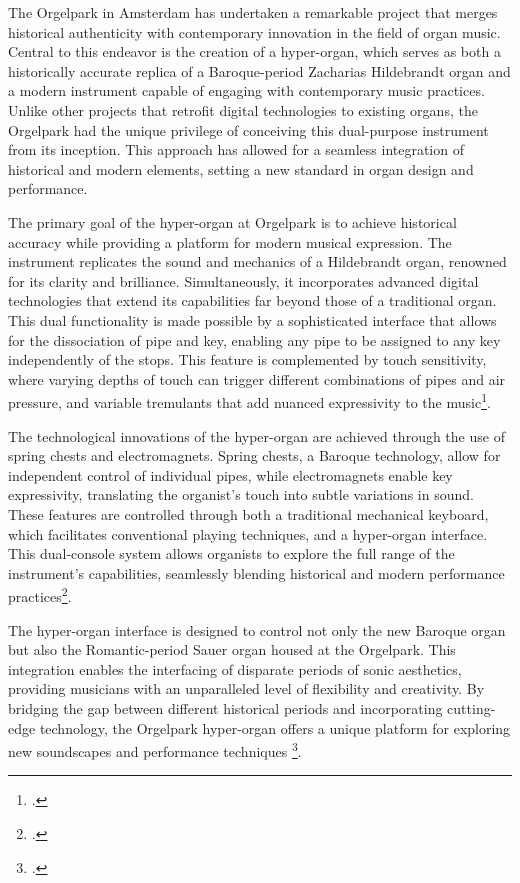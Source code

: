 \documentclass[12pt,twoside,maitrise]{dms_ks}
\theoremstyle{definition}
\begin{document}
{The Orgelpark in Amsterdam has undertaken a remarkable project that merges historical authenticity with contemporary innovation in the field of organ music. 
Central to this endeavor is the creation of a hyper-organ, which serves as both a historically accurate replica of a Baroque-period Zacharias Hildebrandt organ and a modern instrument capable of engaging with contemporary music practices. 
Unlike other projects that retrofit digital technologies to existing organs, the Orgelpark had the unique privilege of conceiving this dual-purpose instrument from its inception. 
This approach has allowed for a seamless integration of historical and modern elements, setting a new standard in organ design and performance.

The primary goal of the hyper-organ at Orgelpark is to achieve historical accuracy while providing a platform for modern musical expression. 
The instrument replicates the sound and mechanics of a Hildebrandt organ, renowned for its clarity and brilliance. 
Simultaneously, it incorporates advanced digital technologies that extend its capabilities far beyond those of a traditional organ. 
This dual functionality is made possible by a sophisticated interface that allows for the dissociation of pipe and key, enabling any pipe to be assigned to any key independently of the stops. 
This feature is complemented by touch sensitivity, where varying depths of touch can trigger different combinations of pipes and air pressure, and variable tremulants that add nuanced expressivity to the music\footcite{fidom_digital_2014}.

The technological innovations of the hyper-organ are achieved through the use of spring chests and electromagnets. 
Spring chests, a Baroque technology, allow for independent control of individual pipes, while electromagnets enable key expressivity, translating the organist's touch into subtle variations in sound. 
These features are controlled through both a traditional mechanical keyboard, which facilitates conventional playing techniques, and a hyper-organ interface. 
This dual-console system allows organists to explore the full range of the instrument's capabilities, seamlessly blending historical and modern performance practices\footcite{peters_how_2014}.

The hyper-organ interface is designed to control not only the new Baroque organ but also the Romantic-period Sauer organ housed at the Orgelpark. 
This integration enables the interfacing of disparate periods of sonic aesthetics, providing musicians with an unparalleled level of flexibility and creativity. By bridging the gap between different historical periods and incorporating cutting-edge technology, the Orgelpark hyper-organ offers a unique platform for exploring new soundscapes and performance techniques \footcite{van_heumen_new_2014}.

}
\end{document}
